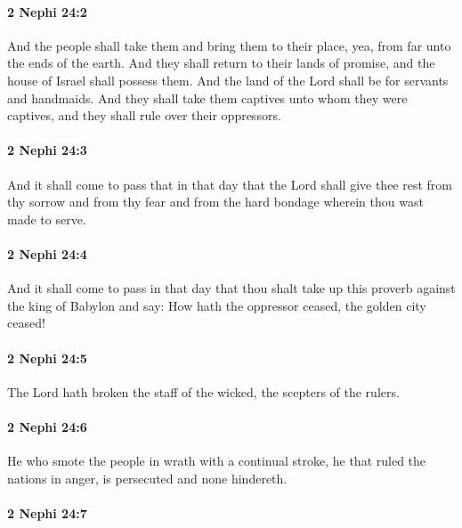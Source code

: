 		\paragraph{2 Nephi 24:2} %
			\label{2NEPHI-24-2}

			And the people shall take them and bring them to their place,
			yea, from far unto the ends of the earth.
			And they shall return to their lands of promise,
			and the house of Israel shall possess them.
			And the land of the Lord shall be for servants and handmaids.
			And they shall take them captives unto whom they were captives,
			and they shall rule over their oppressors.

		\paragraph{2 Nephi 24:3} %
			\label{2NEPHI-24-3}

			And it shall come to pass that in that day
			that the Lord shall give thee rest from thy sorrow and from thy fear
			and from the hard bondage wherein thou wast made to serve.

		\paragraph{2 Nephi 24:4} %
			\label{2NEPHI-24-4}

			And it shall come to pass in that day
			that thou shalt take up this proverb against the king of Babylon and say:
			How hath the oppressor ceased,
			the golden city ceased!

		\paragraph{2 Nephi 24:5} %
			\label{2NEPHI-24-5}

			The Lord hath broken the staff of the wicked,
			the scepters of the rulers.

		\paragraph{2 Nephi 24:6} %
			\label{2NEPHI-24-6}

			He who smote the people in wrath with a continual stroke,
			he that ruled the nations in anger, is persecuted and none hindereth.

		\paragraph{2 Nephi 24:7} %
			\label{2NEPHI-24-7}


